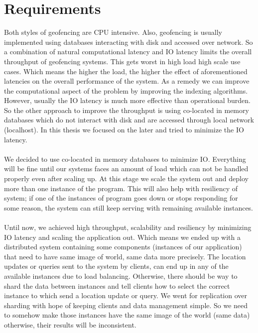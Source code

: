 \documentclass[a4]{report}
\begin{document}
    \section{Requirements}
    Both styles of geofencing are CPU intensive.
    Also, geofencing is usually implemented using databases interacting with disk and accessed over network.
    So a combination of natural computational latency and IO latency limits the overall throughput of geofencing systems.
    This gets worst in high load high scale use cases.
    Which means the higher the load, the higher the effect of aforementioned latencies on the overall performance
    of the system.
    As a remedy we can improve the computational aspect of the problem by improving the indexing algorithms.
    However, usually the IO latency is much more effective than operational burden.
    So the other approach to improve the throughput is using co-located in memory databases which do not interact
    with disk and are accessed through local network (localhost).
    In this thesis we focused on the later and tried to minimize the IO latency.

    \paragraph{}
    We decided to use co-located in memory databases to minimize IO.
    Everything will be fine until our systems faces an amount of load which can not be handled properly even after scaling up.
    At this stage we scale the system out and deploy more than one instance of the program.
    This will also help with resiliency of system;
    if one of the instances of program goes down or stops responding for some reason, the system can still keep
    serving with remaining available instances.

    \paragraph{}
    Until now, we achieved high throughput, scalability and resiliency by minimizing IO latency and scaling the
    application out.
    Which means we ended up with a distributed system containing some components (instances of our application) that
    need to have same image of world, same data more precisely.
    The location updates or queries sent to the system by clients, can end up in any of the available instances due
    to load balancing.
    Otherwise, there should be way to shard the data between instances and tell clients how to select the correct
    instance to which send a location update or query.
    We went for replication over sharding with hope of keeping clients and data management simple.
    So we need to somehow make those instances have the same image of the world (same data) otherwise, their results
    will be inconsistent.
\end{document}
